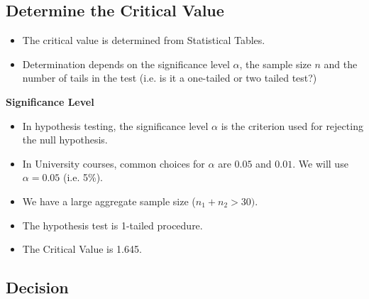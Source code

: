 \documentclass[a4paper,12pt]{article}
\begin{document}
\newpage 
\subsection*{Determine the Critical Value}

\begin{itemize}
\item The critical value is determined from Statistical Tables.
\item Determination depends on the significance level $\alpha$, the sample size $n$ and the number of tails in the test (i.e. is it a one-tailed or two tailed test?)
\end{itemize}

\noindent \textbf{Significance Level}

\begin{itemize}
\item In hypothesis testing, the significance level $\alpha$ is the criterion used for rejecting the null hypothesis. 

\item In University courses, common choices for $\alpha$ are $0.05$ and $0.01$. We will use $\alpha =0.05$ (i.e. 5\%).
\item We have a large aggregate sample size ($n_1 + n_2 > 30)$.
\item The hypothesis test is 1-tailed procedure.
\item The Critical Value is 1.645.
\end{itemize}



\newpage 
\subsection*{Decision}
\end{document}
